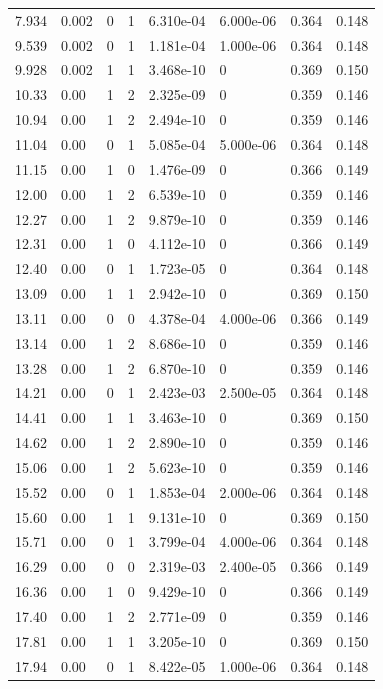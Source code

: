 \documentclass[preview]{standalone}
\begin{document}
{{\begin{tabular}{L{1.2cm}C{1.2cm} C{0.3cm}C{0.5cm} C{1.4cm}C{1.4cm} C{1.4cm}C{1.4cm}}
  7.934  &  0.002  & 0     &  1 &  6.310e-04  & 6.000e-06  & 0.364 &  0.148   \\ 
  9.539  &  0.002  & 0     &  1 &  1.181e-04  & 1.000e-06  & 0.364 &  0.148   \\ 
  9.928  &  0.002  & 1     &  1 &  3.468e-10  & 0  & 0.369 &  0.150   \\ 
  10.33  &  0.00  & 1     &  2 &  2.325e-09  & 0  & 0.359 &  0.146   \\ 
  10.94  &  0.00  & 1     &  2 &  2.494e-10  & 0  & 0.359 &  0.146   \\ 
  11.04  &  0.00  & 0     &  1 &  5.085e-04  & 5.000e-06  & 0.364 &  0.148   \\ 
  11.15  &  0.00  & 1     &  0 &  1.476e-09  & 0  & 0.366 &  0.149   \\ 
  12.00  &  0.00  & 1     &  2 &  6.539e-10  & 0  & 0.359 &  0.146   \\ 
  12.27  &  0.00  & 1     &  2 &  9.879e-10  & 0  & 0.359 &  0.146   \\ 
  12.31  &  0.00  & 1     &  0 &  4.112e-10  & 0  & 0.366 &  0.149   \\ 
  12.40  &  0.00  & 0     &  1 &  1.723e-05  & 0  & 0.364 &  0.148   \\ 
  13.09  &  0.00  & 1     &  1 &  2.942e-10  & 0  & 0.369 &  0.150   \\ 
  13.11  &  0.00  & 0     &  0 &  4.378e-04  & 4.000e-06  & 0.366 &  0.149   \\ 
  13.14  &  0.00  & 1     &  2 &  8.686e-10  & 0  & 0.359 &  0.146   \\ 
  13.28  &  0.00  & 1     &  2 &  6.870e-10  & 0  & 0.359 &  0.146   \\ 
  14.21  &  0.00  & 0     &  1 &  2.423e-03  & 2.500e-05  & 0.364 &  0.148   \\ 
  14.41  &  0.00  & 1     &  1 &  3.463e-10  & 0  & 0.369 &  0.150   \\ 
  14.62  &  0.00  & 1     &  2 &  2.890e-10  & 0  & 0.359 &  0.146   \\ 
  15.06  &  0.00  & 1     &  2 &  5.623e-10  & 0  & 0.359 &  0.146   \\ 
  15.52  &  0.00  & 0     &  1 &  1.853e-04  & 2.000e-06  & 0.364 &  0.148   \\ 
  15.60  &  0.00  & 1     &  1 &  9.131e-10  & 0  & 0.369 &  0.150   \\ 
  15.71  &  0.00  & 0     &  1 &  3.799e-04  & 4.000e-06  & 0.364 &  0.148   \\ 
  16.29  &  0.00  & 0     &  0 &  2.319e-03  & 2.400e-05  & 0.366 &  0.149   \\ 
  16.36  &  0.00  & 1     &  0 &  9.429e-10  & 0  & 0.366 &  0.149   \\ 
  17.40  &  0.00  & 1     &  2 &  2.771e-09  & 0  & 0.359 &  0.146   \\ 
  17.81  &  0.00  & 1     &  1 &  3.205e-10  & 0  & 0.369 &  0.150   \\ 
  17.94  &  0.00  & 0     &  1 &  8.422e-05  & 1.000e-06  & 0.364 &  0.148   \\ 
\hline 
\end{tabular} 

}}
\end{document}
